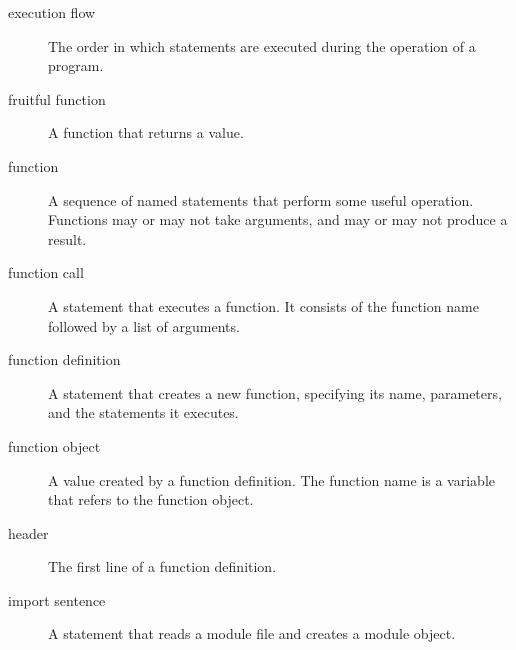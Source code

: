 \begin{description}
\item[execution flow]
The order in which statements are executed during the operation of a program.
\end{description}

\begin{description}
\item[fruitful function]
A function that returns a value.
\end{description}

\begin{description}
\item[function]
A sequence of named statements that perform some useful operation. Functions may or may not take arguments, and may or may not produce a result.
\end{description}

\begin{description}
\item[function call]
A statement that executes a function. It consists of the function name followed by a list of arguments.
\end{description}

\begin{description}
\item[function definition]
A statement that creates a new function, specifying its name, parameters, and the statements it executes.
\end{description}

\begin{description}
\item[function object]
A value created by a function definition. The function name is a variable that refers to the function object.
\end{description}

\begin{description}
\item[header]
The first line of a function definition.
\end{description}

\begin{description}
\item[import sentence]
A statement that reads a module file and creates a module object.
\end{description}
 

